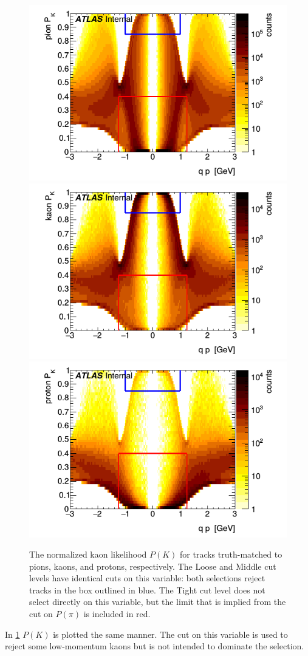 \begin{figure}[t]
\begin{minipage}[t]{1.0\textwidth}
\centering
\includegraphics[width=.32\linewidth]{P_pion_K.png}
\includegraphics[width=.32\linewidth]{P_kaon_K.png}
\includegraphics[width=.32\linewidth]{P_proton_K.png}
\end{minipage}
\caption{The normalized kaon likelihood $P(K)$ for tracks truth-matched to pions, kaons, and protons, respectively. The Loose and Middle cut levels have identical cuts on this variable: both selections reject tracks in the box outlined in blue. The Tight cut level does not select directly on this variable, but the limit that is implied from the cut on $P(\pi)$ is included in red.}
\label{fig:prob_k}
\end{figure}

In \cref{fig:prob_k} $P(K)$ is plotted the same manner.
The cut on this variable is used to reject some low-momentum kaons but is not intended to dominate the selection.


